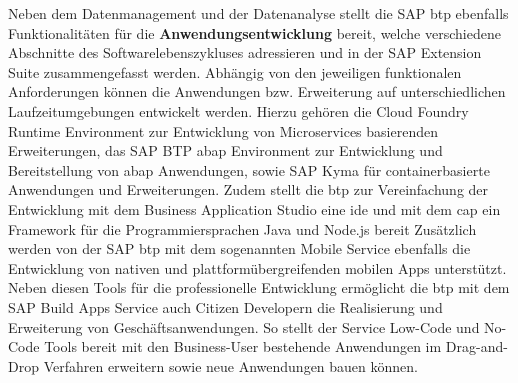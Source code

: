 Neben dem Datenmanagement und der Datenanalyse stellt die SAP \ac{btp} ebenfalls Funktionalitäten für die \textbf{Anwendungsentwicklung} bereit, welche verschiedene Abschnitte des Softwarelebenszykluses adressieren und in der SAP Extension Suite zusammengefasst werden. Abhängig von den jeweiligen funktionalen Anforderungen können die Anwendungen bzw. Erweiterung auf unterschiedlichen Laufzeitumgebungen entwickelt werden. Hierzu gehören die Cloud Foundry Runtime Environment zur Entwicklung von Microservices basierenden Erweiterungen, das SAP BTP \ac{abap} Environment zur Entwicklung und Bereitstellung von \ac{abap} Anwendungen, sowie SAP Kyma für containerbasierte Anwendungen und Erweiterungen. Zudem stellt die \ac{btp} zur Vereinfachung der Entwicklung mit dem Business Application Studio eine \ac{ide} und mit dem \ac{cap} ein Framework für die Programmiersprachen Java und Node.js bereit \autocite[Vgl.][S. 67-69]{SEUBERT} Zusätzlich werden von der SAP \ac{btp} mit dem sogenannten Mobile Service ebenfalls die Entwicklung von nativen und plattformübergreifenden mobilen Apps unterstützt. \autocite[Vgl.][S. 217-219]{SEUBERT} Neben diesen Tools für die professionelle Entwicklung ermöglicht die \ac{btp} mit dem SAP Build Apps Service auch Citizen Developern die Realisierung und Erweiterung von Geschäftsanwendungen. So stellt der Service Low-Code und No-Code Tools bereit mit den Business-User bestehende Anwendungen im Drag-and-Drop Verfahren erweitern sowie neue Anwendungen bauen können. \autocite[Vgl.][S. 4]{SAPBUILDAPPS}

